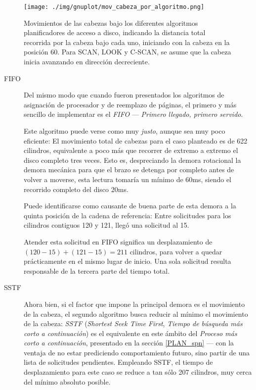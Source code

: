 \documentclass[11pt,fleqn]{book} %
\begin{document}
\begin{figure}[htb]
\centering
\texttt{[image: ./img/gnuplot/mov\_cabeza\_por\_algoritmo.png]}
\caption{\label{FS_FIS_mov_cabeza_por_algoritmo}Movimientos de las cabezas bajo los diferentes algoritmos planificadores de acceso a disco, indicando la distancia total recorrida por la cabeza bajo cada uno, iniciando con la cabeza en la posición 60. Para SCAN, LOOK y C-SCAN, se asume que la cabeza inicia avanzando en dirección decreciente.}
\end{figure}

\begin{description}
\item[FIFO] Del mismo modo que cuando fueron presentados los algoritmos
          de asignación de procesador y de reemplazo de páginas, el
          primero y más sencillo de implementar es el \emph{FIFO} —
          \emph{Primero llegado, primero servido}.

          Este algoritmo puede verse como muy
          \emph{justo}, aunque sea muy poco eficiente: El movimiento total
          de cabezas para el caso planteado es de 622 cilindros,
          equivalente a poco más que recorrer de extremo a extremo el
          disco completo tres veces. Esto es, despreciando la demora
          rotacional la demora mecánica para que el brazo se detenga por
          completo antes de volver a moverse, esta lectura tomaría un
          mínimo de 60ms, siendo el recorrido completo del disco 20ms.

	  Puede identificarse como causante de buena parte de esta
          demora a la quinta posición de la cadena de referencia:
          Entre solicitudes para los cilindros contiguos 120 y 121,
          llegó una solicitud al 15.

	  Atender esta solicitud en FIFO significa un desplazamiento
          de $(120-15) + (121-15) = 211$ cilindros, para volver a
          quedar prácticamente en el mismo lugar de inicio. Una sola
          solicitud resulta responsable de la tercera parte del tiempo
          total.
\item[SSTF] Ahora bien, si el factor que impone la principal demora es
          el movimiento de la cabeza, el segundo algoritmo busca
          reducir al mínimo el movimiento de la cabeza: \emph{SSTF}
          (\emph{Shortest Seek Time First}, \emph{Tiempo de búsqueda más corto a           continuación}) es el equivalente en este ámbito del
          \emph{Proceso más corto a continuación}, presentado en la sección
          \ref{PLAN_spn} — con la ventaja de no estar prediciendo
          comportamiento futuro, sino partir de una lista de
          solicitudes pendientes. Empleando SSTF, el tiempo de
          desplazamiento para este caso se reduce a tan sólo 207
          cilindros, muy cerca del mínimo absoluto posible.


\end{description}
\end{document}
